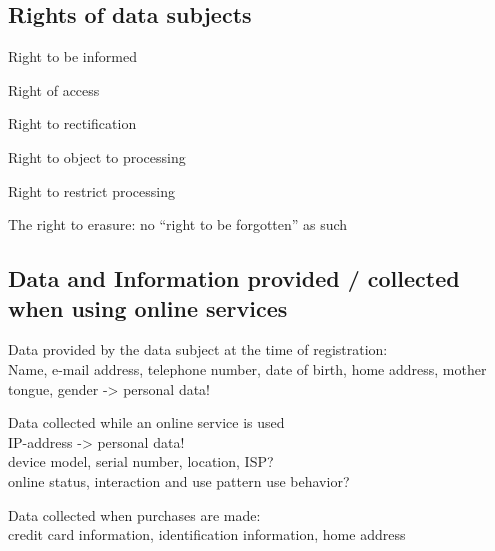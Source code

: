 \subsection{Rights of data subjects}
\begin{compactitem}
	\item Right to be informed
	\item Right of access
	\item Right to rectification
	\item Right to object to processing
	\item Right to restrict processing
	\item The right to erasure: no “right to be forgotten” as such
\end{compactitem}

\subsection{Data and Information provided / collected when using online services}
\begin{compactitem}
	\item Data provided by the data subject at the time of registration:\\
		Name, e-mail address, telephone number, date of birth, home address, mother tongue, gender -> personal data!
	\item Data collected while an online service is used\\
		IP-address -> personal data!\\
		device model, serial number, location, ISP?\\
		online status, interaction and use pattern use behavior?
	\item Data collected when purchases are made:\\
		credit card information, identification information, home address
\end{compactitem}

